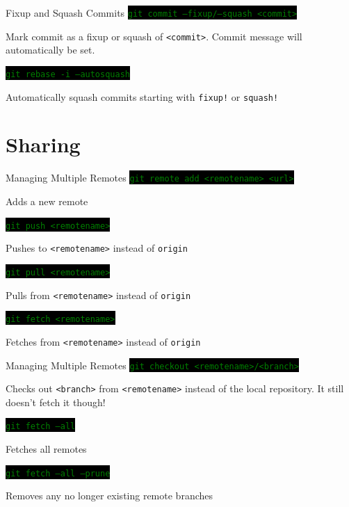 \documentclass[
14pt,
aspectratio=169,
usenames,
dvipsnames,
x11names]{beamer}
\newcommand{\code}[1]{{\small\colorbox{black}{\textcolor{green}{\texttt{#1}}}}}
\begin{document}
\begin{frame}{Fixup and Squash Commits}
    \code{git commit --fixup/--squash <commit>}

    Mark commit as a fixup or squash of \texttt{<commit>}.
    Commit message will automatically be set.

    \vfill
    \pause

    \code{git rebase -i --autosquash}

    Automatically squash commits starting with \texttt{fixup!} or \texttt{squash!}
\end{frame}

\section{Sharing}

\begin{frame}{Managing Multiple Remotes}
  \code{git remote add <remotename> <url>}

  Adds a new remote

  \vfill
  \pause

  \code{git push <remotename>}

  Pushes to \texttt{<remotename>} instead of \texttt{origin}

  \vfill
  \pause

  \code{git pull <remotename>}

  Pulls from \texttt{<remotename>} instead of \texttt{origin}

  \vfill
  \pause

  \code{git fetch <remotename>}

  Fetches from \texttt{<remotename>} instead of \texttt{origin}

\end{frame}

\begin{frame}{Managing Multiple Remotes}
  \code{git checkout <remotename>/<branch>}

  Checks out \texttt{<branch>} from \texttt{<remotename>} instead of the local repository.
  It still \alert{doesn't fetch it} though!

  \vfill
  \pause

  \code{git fetch --all}

  Fetches all remotes

  \vfill
  \pause

  \code{git fetch --all --prune}

  Removes any no longer existing remote branches

\end{frame}
\end{document}
